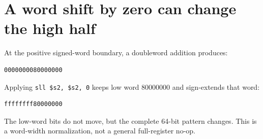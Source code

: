 \section{A word shift by zero can change the high
  half}\label{004-bit-inspector-x-normalization-a-word-shift-by-zero-can-change-the-high-half}

At the positive signed-word boundary, a doubleword addition produces:

\begin{verbatim}
0000000080000000
\end{verbatim}

Applying \texttt{sll\ \$s2,\ \$s2,\ 0} keeps low word 80000000 and
sign-extends that word:

\begin{verbatim}
ffffffff80000000
\end{verbatim}

The low-word bits do not move, but the complete 64-bit pattern changes.
This is a word-width normalization, not a general full-register no-op.
